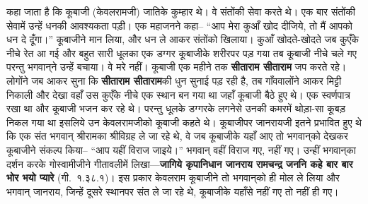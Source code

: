 \begin{sloppypar}\justifying{}
कहा जाता है कि कूबाजी (केवलरामजी) जातिके कुम्हार थे। वे संतोंकी सेवा करते थे। एक बार संतोंकी सेवामें उन्हें धनकी आवश्यकता पड़ी। एक महाजनने कहा– “आप मेरा कुआँ खोद दीजिये, तो मैं आपको धन दे दूँगा।” कूबाजीने मान लिया, और धन ले आकर संतोंको खिलाया। कुआँ खोदते-खोदते जब कुएँके नीचे रेत आ गई और बहुत सारी धूलका एक डग्गर कूबाजीके शरीरपर पड़ गया तब कूबाजी नीचे चले गए परन्तु भगवान्‌ने उन्हें बचाया। वे मरे नहीं। कूबाजी एक महीने तक \textbf{सीता\-राम सीता\-राम} जप करते रहे। लोगोंने जब आकर सुना कि \textbf{सीता\-राम सीता\-राम}की धुन सुनाई पड़ रही है, तब गाँववालोंने आकर मिट्टी निकाली और देखा वहाँ उस कुएँके नीचे एक स्थान बन गया था जहाँ कूबाजी बैठे हुए थे। एक स्वर्णपात्र रखा था और कूबाजी भजन कर रहे थे। परन्तु धूलके डग्गरके लगनेसे उनकी कमरमें थोड़ा-सा कूबड़ निकल गया था इसलिये उन केवलरामजीको कूबाजी कहते थे। कूबाजीपर जानरायजी इतने प्रभावित हुए थे कि एक संत भगवान् श्रीरामका श्रीविग्रह ले जा रहे थे, वे जब कूबाजीके यहाँ आए तो भगवान्‌को देखकर कूबाजीने संकल्प किया– “आप यहीं विराज जाइये।” भगवान् वहीं विराज गए, नहीं गए। उन्हीं भगवान्‌का दर्शन करके गोस्वामीजीने गीतावलीमें लिखा—\textbf{जागिये कृपानिधान जानराय रामचन्द्र जननि कहे बार बार भोर भयो प्यारे} (गी.~१.३८.१)। इस प्रकार केवलराम कूबाजीने तो भगवान्‌को ही मोल ले लिया और भगवान् जानराय, जिन्हें दूसरे स्थानपर संत ले जा रहे थे, कूबाजीके यहाँसे नहीं गए तो नहीं ही गए।
\end{sloppypar}


